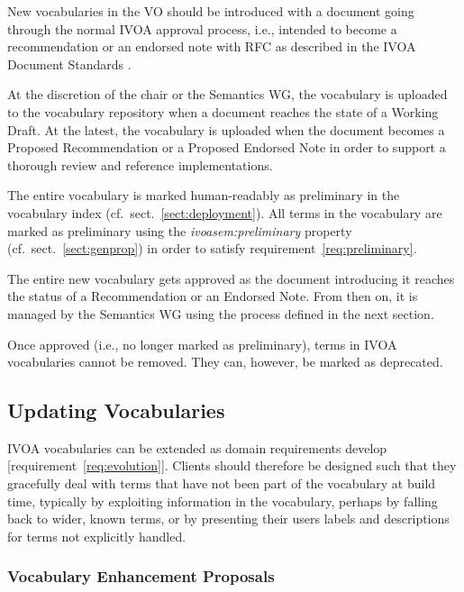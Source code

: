 \documentclass[11pt,a4paper]{ivoa}
\newcommand{\vocterm}[1]{\emph{\color{termcolor}#1}}
\begin{document}
New vocabularies in the VO should be introduced with a document going
through the normal IVOA approval process, i.e., intended to become a
recommendation or an endorsed note with RFC as described in the IVOA
Document Standards \citep{2017ivoa.spec.0517G}.

At the discretion of the chair or the Semantics WG, the vocabulary is
uploaded to the vocabulary repository when a document reaches the state
of a Working Draft.  At the latest, the vocabulary is uploaded when the
document becomes a Proposed Recommendation or a Proposed Endorsed Note
in order to support a thorough review and reference implementations.

The entire vocabulary is marked human-readably as preliminary in the
vocabulary index (cf.~sect.~\ref{sect:deployment}).  All terms in the
vocabulary are marked as preliminary using the
\vocterm{ivoasem:preliminary} property (cf.~sect.~\ref{sect:genprop}) in
order to satisfy requirement~\ref{req:preliminary}.

The entire new vocabulary gets approved as the document introducing it
reaches the status of a Recommendation or an Endorsed Note.  From then
on, it is managed by the Semantics WG using the process defined in
the next section.

Once approved (i.e., no longer marked as preliminary), 
terms in IVOA vocabularies cannot be removed.  They can,
however, be marked as deprecated.

\subsection{Updating Vocabularies}
\label{sect:updating-vocabularies}

IVOA vocabularies can be extended as domain requirements develop
[requirement~\ref{req:evolution}].  Clients
should therefore be designed such that they gracefully deal with terms
that have not been part of the vocabulary at build time, typically by
exploiting information in the vocabulary, perhaps by falling back to
wider, known terms, or by presenting their users labels and descriptions
for terms not explicitly handled.


\subsubsection{Vocabulary Enhancement Proposals}
\end{document}
